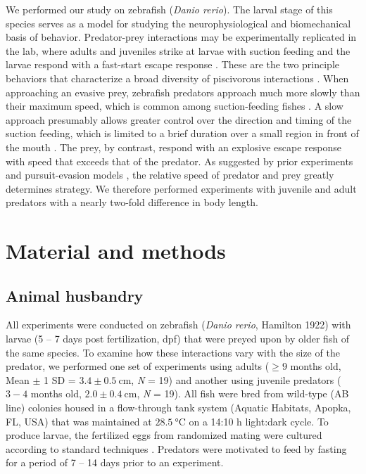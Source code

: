 \documentclass[]{rsos}%
\begin{document}
We performed our study on zebrafish (\textit{Danio rerio}). 
The larval stage of this species serves as a model for studying the neurophysiological \cite{Bianco:2015gm,Bagnall:2014iu,Huang:2013vj} and biomechanical \cite{Muller:2004hp,Li:2016cy} basis of behavior.
Predator-prey interactions may be experimentally replicated in the lab, where adults and juveniles strike at larvae with suction feeding and the larvae respond with a fast-start escape response \cite{Stewart:2013bha}.
These are the two principle behaviors that characterize a broad diversity of piscivorous interactions \cite{Weihs:1984tb,Walker:2005vn,Higham:2007go,Higham:2005iu}. 
When approaching an evasive prey, zebrafish predators approach much more slowly than their maximum speed, which is common among suction-feeding fishes \cite{Higham:2005iu,Higham:2007go}.
A slow approach presumably allows greater control over the direction and timing of the suction feeding, which is limited to a brief duration over a small region in front of the mouth \cite{Holzman:2008jc,Holzman:2009uu}. 
The prey, by contrast, respond with an explosive escape response with speed that exceeds that of the predator. 
As suggested by prior experiments \cite{Fuiman:1994td} and pursuit-evasion models \cite{Weihs:1984tb}, the relative speed of predator and prey greatly determines strategy.
We therefore performed experiments with juvenile and adult predators with a nearly two-fold difference in body length.


\section{Material and methods}

\subsection{Animal husbandry}
All experiments were conducted on zebrafish (\textit{Danio rerio}, Hamilton 1922) with larvae (5 -- 7 days post fertilization, dpf) that were preyed upon by older fish of the same species. 
To examine how these interactions vary with the size of the predator, we performed one set of experiments using adults ($\geq 9$ months old, Mean $\pm$ 1 SD = $3.4 \pm \SI{0.5}{\cm}$, \textit{N} = 19) and another using juvenile predators ($3-4$ months old, $2.0  \pm  \SI{0.4}{\cm}$, \textit{N} = 19).
All fish were bred from wild-type (AB line) colonies housed in a flow-through tank system (Aquatic Habitats, Apopka, FL, USA) that was maintained at $\SI{28.5}{\celsius}$ on a 14:10 h light:dark cycle. 
To produce larvae, the fertilized eggs from randomized mating were cultured according to standard techniques \cite{Westerfield:UXiBrEuA}.
Predators were motivated to feed by fasting for a period of 7 -- 14 days prior to an experiment.
\end{document}
